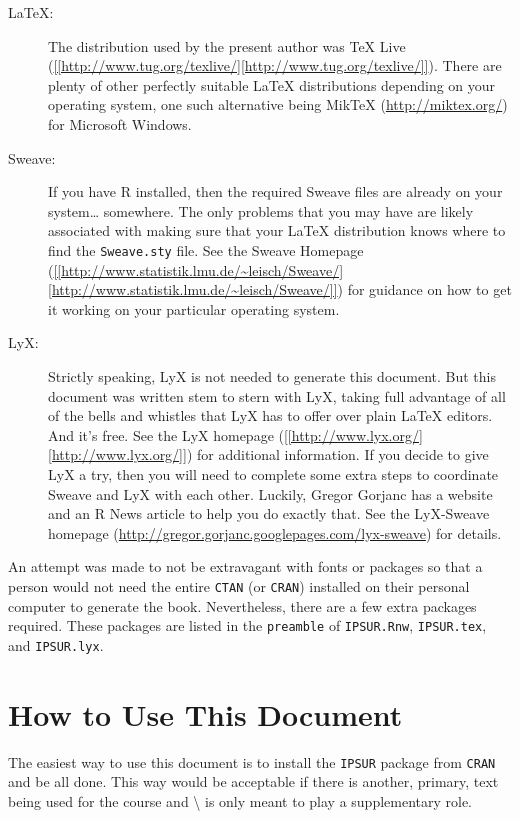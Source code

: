 \documentclass[captions=tableheading]{scrbook}
\begin{document}
\begin{description}
\item[\LaTeX{}:] The distribution used by the present author was \TeX{} Live (\url{[[http://www.tug.org/texlive/][http://www.tug.org/texlive/]]}). There are plenty of other perfectly suitable \LaTeX{} distributions depending on your operating system, one such alternative being MikTeX (\url{http://miktex.org/}) for Microsoft Windows.
\item[Sweave:] If you have \textsf{R} installed, then the required Sweave files are already on your system\ldots{} somewhere. The only problems that you may have are likely associated with making sure that your \LaTeX{} distribution knows where to find the \texttt{Sweave.sty} file. See the Sweave Homepage (\url{[[http://www.statistik.lmu.de/~leisch/Sweave/][http://www.statistik.lmu.de/~leisch/Sweave/]]}) for guidance on how to get it working on your particular operating system.
\item[LyX:] Strictly speaking, LyX is not needed to generate this document. But this document was written stem to stern with LyX, taking full advantage of all of the bells and whistles that LyX has to offer over plain \LaTeX{} editors. And it's free. See the LyX homepage (\url{[[http://www.lyx.org/][http://www.lyx.org/]]}) for additional information. If you decide to give LyX a try, then you will need to complete some extra steps to coordinate Sweave and LyX with each other. Luckily, Gregor Gorjanc has a website and an \textsf{R} News article \cite{Gorjanc2008} to help you do exactly that. See the LyX-Sweave homepage (\url{http://gregor.gorjanc.googlepages.com/lyx-sweave}) for details.
\end{description}

An attempt was made to not be extravagant with fonts or packages so that a person would not need the entire \texttt{CTAN} (or \texttt{CRAN}) installed on their personal computer to generate the book. Nevertheless, there are a few extra packages required. These packages are listed in the \texttt{preamble} of \texttt{IPSUR.Rnw}, \texttt{IPSUR.tex}, and \texttt{IPSUR.lyx}.
\section{How to Use This Document \label{sec:How-to-Use-Document}}
\label{sec-8-2}


The easiest way to use this document is to install the \texttt{IPSUR} package from \texttt{CRAN} and be all done. This way would be acceptable if there is another, primary, text being used for the course and \IPSUR\textbackslash{} is only meant to play a supplementary role.
\end{document}
